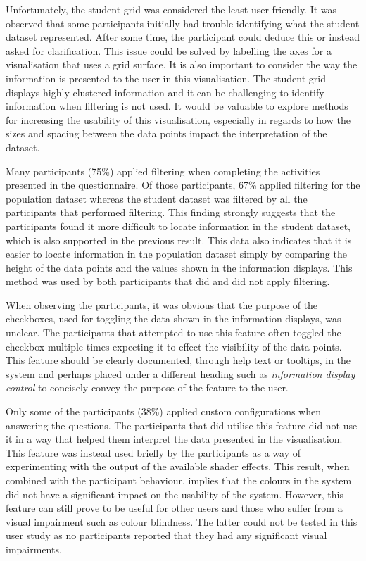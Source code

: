 {{		Unfortunately, the student grid was considered the least user-friendly. It was observed that some participants initially had trouble identifying what the student dataset represented. After some time, the participant could deduce this or instead asked for clarification. This issue could be solved by labelling the axes for a visualisation that uses a grid surface. It is also important to consider the way the information is presented to the user in this visualisation. The student grid displays highly clustered information and it can be challenging to identify information when filtering is not used. It would be valuable to explore methods for increasing the usability of this visualisation, especially in regards to how the sizes and spacing between the data points impact the interpretation of the dataset.

		Many participants (75\%) applied filtering when completing the activities presented in the questionnaire. Of those participants, 67\% applied filtering for the population dataset whereas the student dataset was filtered by all the participants that performed filtering. This finding strongly suggests that the participants found it more difficult to locate information in the student dataset, which is also supported in the previous result. This data also indicates that it is easier to locate information in the population dataset simply by comparing the height of the data points and the values shown in the information displays. This method was used by both participants that did and did not apply filtering.

		When observing the participants, it was obvious that the purpose of the checkboxes, used for toggling the data shown in the information displays, was unclear. The participants that attempted to use this feature often toggled the checkbox multiple times expecting it to effect the visibility of the data points. This feature should be clearly documented, through help text or tooltips, in the system and perhaps placed under a different heading such as \emph{information display control} to concisely convey the purpose of the feature to the user.

		Only some of the participants (38\%) applied custom configurations when answering the questions. The participants that did utilise this feature did not use it in a way that helped them interpret the data presented in the visualisation. This feature was instead used briefly by the participants as a way of experimenting with the output of the available shader effects. This result, when combined with the participant behaviour, implies that the colours in the system did not have a significant impact on the usability of the system. However, this feature can still prove to be useful for other users and those who suffer from a visual impairment such as colour blindness. The latter could not be tested in this user study as no participants reported that they had any significant visual impairments.

}}
